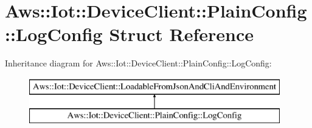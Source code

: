 \hypertarget{struct_aws_1_1_iot_1_1_device_client_1_1_plain_config_1_1_log_config}{}\section{Aws\+:\+:Iot\+:\+:Device\+Client\+:\+:Plain\+Config\+:\+:Log\+Config Struct Reference}
\label{struct_aws_1_1_iot_1_1_device_client_1_1_plain_config_1_1_log_config}
Inheritance diagram for Aws\+:\+:Iot\+:\+:Device\+Client\+:\+:Plain\+Config\+:\+:Log\+Config\+:\begin{figure}[H]
\begin{center}
\leavevmode
\includegraphics[height=2.000000cm]{struct_aws_1_1_iot_1_1_device_client_1_1_plain_config_1_1_log_config}
\end{center}
\end{figure}
